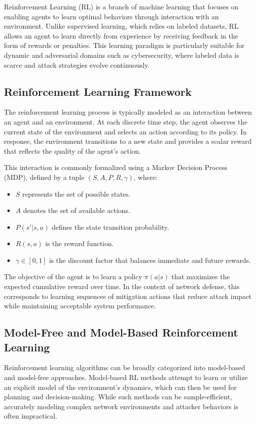 \documentclass[12pt,a4paper]{report}
\begin{document}
Reinforcement Learning (RL) is a branch of machine learning that focuses on enabling agents to learn optimal behaviors through interaction with an environment.
Unlike supervised learning, which relies on labeled datasets, RL allows an agent to learn directly from experience by receiving feedback in the form of rewards or penalties.
This learning paradigm is particularly suitable for dynamic and adversarial domains such as cybersecurity, where labeled data is scarce and attack strategies evolve continuously.

\subsection{Reinforcement Learning Framework}

The reinforcement learning process is typically modeled as an interaction between an agent and an environment.
At each discrete time step, the agent observes the current state of the environment and selects an action according to its policy.
In response, the environment transitions to a new state and provides a scalar reward that reflects the quality of the agent’s action.

This interaction is commonly formalized using a Markov Decision Process (MDP), defined by a tuple $(S, A, P, R, \gamma)$, where:
\begin{itemize}
    \item $S$ represents the set of possible states.
    \item $A$ denotes the set of available actions.
    \item $P(s'|s,a)$ defines the state transition probability.
    \item $R(s,a)$ is the reward function.
    \item $\gamma \in [0,1]$ is the discount factor that balances immediate and future rewards.
\end{itemize}

The objective of the agent is to learn a policy $\pi(a|s)$ that maximizes the expected cumulative reward over time.
In the context of network defense, this corresponds to learning sequences of mitigation actions that reduce attack impact while maintaining acceptable system performance.

\subsection{Model-Free and Model-Based Reinforcement Learning}

Reinforcement learning algorithms can be broadly categorized into model-based and model-free approaches.
Model-based RL methods attempt to learn or utilize an explicit model of the environment’s dynamics, which can then be used for planning and decision-making.
While such methods can be sample-efficient, accurately modeling complex network environments and attacker behaviors is often impractical.
\end{document}
